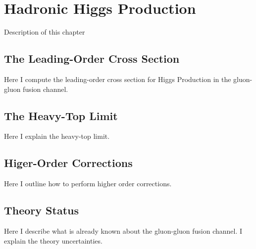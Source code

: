 
\chapter{Hadronic Higgs Production}\label{chap:two}

Description of this chapter

\section{The Leading-Order Cross Section}
Here I compute the leading-order cross section for Higgs Production in the gluon-gluon fusion channel.
\section{The Heavy-Top Limit}
Here I explain the heavy-top limit.
\section{Higer-Order Corrections}
Here I outline how to perform higher order corrections.
\section{Theory Status}
Here I describe what is already known about the gluon-gluon fusion channel. I explain the theory uncertainties.


